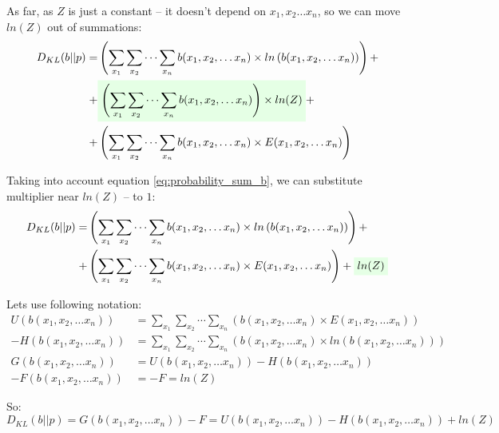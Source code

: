 \documentclass[fleqn,leqno]{article}
\newcommand{\highlight}[1]{\colorbox{green!10}{$\displaystyle#1$}}
\begin{document}
As far, as $Z$ is just a constant -- it doesn't depend on $x_1, x_2 \dots x_n$, so we can move $ln(Z)$ out of summations:
\begin{equation}
\begin{split}
D_{KL}(b||p) = & \left( \sum_{x_1} \sum_{x_2} \cdots \sum_{x_n} b(x_1, x_2, \dots x_n) \times ln \left( b(x_1, x_2, \dots x_n) \right) \right) + \\
            + & \highlight{ \left( \sum_{x_1} \sum_{x_2} \cdots \sum_{x_n} b(x_1, x_2, \dots x_n) \right) \times ln(Z) } + \\
            + & \left( \sum_{x_1} \sum_{x_2} \cdots \sum_{x_n} b(x_1, x_2, \dots x_n) \times E(x_1, x_2, \dots x_n) \right) \\
\end{split}
\end{equation}

Taking into account equation \eqref{eq:probability_sum_b}, we can substitute multiplier near $ln(Z)$ -- to $1$:
\begin{equation}
\begin{split}
D_{KL}(b||p) = & \left( \sum_{x_1} \sum_{x_2} \cdots \sum_{x_n} b(x_1, x_2, \dots x_n) \times ln \left( b(x_1, x_2, \dots x_n) \right) \right) + \\
            + & \left( \sum_{x_1} \sum_{x_2} \cdots \sum_{x_n} b(x_1, x_2, \dots x_n) \times E(x_1, x_2, \dots x_n) \right) + \highlight{ ln(Z) }
\end{split}
\end{equation}

Lets use following notation:
\begin{equation} \label{eq:U_H_G_F}
\begin{split}
U(b(x_1,x_2,\dots x_n))  & = \sum_{x_1} \sum_{x_2} \cdots \sum_{x_n} \left( b(x_1, x_2, \dots x_n) \times E(x_1, x_2, \dots x_n) \right) \\
-H(b(x_1,x_2,\dots x_n)) & = \sum_{x_1} \sum_{x_2} \cdots \sum_{x_n} \left( b(x_1, x_2, \dots x_n) \times ln \left( b(x_1, x_2, \dots x_n) \right) \right) \\
G(b(x_1,x_2,\dots x_n))  & = U(b(x_1,x_2,\dots x_n)) - H(b(x_1,x_2,\dots x_n)) \\
-F(b(x_1,x_2,\dots x_n)) & = -F = ln(Z)
\end{split}
\end{equation}

So:
\begin{equation} \label{eq:kl_divergence_via_U_H_ln_Z}
D_{KL}(b||p) = G(b(x_1,x_2,\dots x_n)) - F = U(b(x_1,x_2,\dots x_n)) - H(b(x_1,x_2,\dots x_n)) + ln(Z)
\end{equation}
\end{document}
